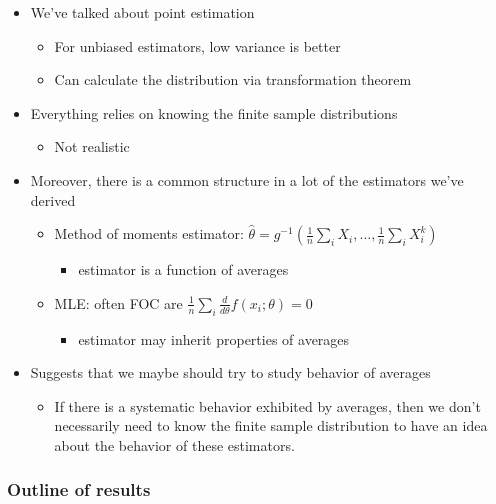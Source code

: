 \documentclass[11pt]{article}
\begin{document}
\begin{itemize}
\item We've talked about point estimation
\begin{itemize}
\item For unbiased estimators, low variance is better
\item Can calculate the distribution via transformation theorem
\end{itemize}
\item Everything relies on knowing the finite sample distributions
\begin{itemize}
\item Not realistic
\end{itemize}
\item Moreover, there is a common structure in a lot of the estimators
       we've derived
\begin{itemize}
\item Method of moments estimator: $\hat\theta =
         g^{-1}(\frac{1}{n}\sum_i X_i, \dots, \frac{1}{n} \sum_i X_i^k)$
\begin{itemize}
\item estimator is a function of averages
\end{itemize}
\item MLE: often FOC are $\frac{1}{n} \sum_i \frac{d}{d\theta}
         f(x_i; \theta) = 0$
\begin{itemize}
\item estimator may inherit properties of averages
\end{itemize}
\end{itemize}
\item Suggests that we maybe should try to study behavior of averages
\begin{itemize}
\item If there is a systematic behavior exhibited by averages, then
         we don't necessarily need to know the finite sample
         distribution to have an idea about the behavior of these estimators.
\end{itemize}
\end{itemize}
\subsubsection{Outline of results}
\label{sec-1-1-1}
\end{document}
